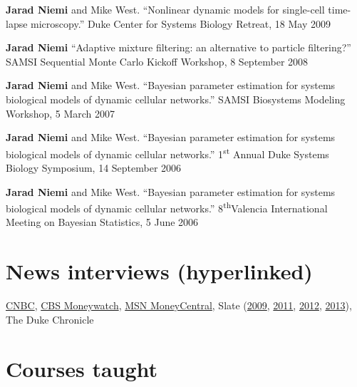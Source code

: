 \documentclass[overlapped,line]{res}
\begin{document}
\begin{resume}
{{\bf Jarad Niemi} and Mike West. ``Nonlinear dynamic models for single-cell time-lapse microscopy.'' Duke Center for Systems Biology Retreat, 18 May 2009

{\bf Jarad Niemi} ``Adaptive mixture filtering: an alternative to particle filtering?'' SAMSI Sequential Monte Carlo Kickoff Workshop, 8 September 2008

{\bf Jarad Niemi} and Mike West. ``Bayesian parameter estimation for systems biological models of dynamic cellular networks.'' SAMSI Biosystems Modeling Workshop, 5 March 2007

{\bf Jarad Niemi} and Mike West. ``Bayesian parameter estimation for systems biological models of dynamic cellular networks.'' 1\textsuperscript{st} Annual Duke Systems Biology Symposium, 14 September 2006

{\bf Jarad Niemi} and Mike West. ``Bayesian parameter estimation for systems biological models of dynamic cellular networks.'' 8\textsuperscript{th}Valencia International Meeting on Bayesian Statistics, 5 June 2006

}

\section{\bf News interviews (hyperlinked)}

\href{http://www.nbcnews.com/business/slam-dunk-your-rivals-office-march-madness-pool-1C8912546}{CNBC}, %
\href{http://moneywatch.bnet.com/economic-news/article/ncaa-brackets-how-to-win-your-march-madness-pool/403055/?tag=main;related-link-0}{CBS Moneywatch}, 
\href{http://articles.moneycentral.msn.com/SmartSpending/blog/page.aspx?post=1704157}{MSN MoneyCentral}, 
Slate (\href{http://www.slate.com/id/2213974/pagenum/all/}{2009}, \href{http://www.slate.com/id/2288234/pagenum/all/}{2011}, 
\href{http://www.slate.com/articles/sports/sports_nut/2012/03/ncaa_basketball_tournament_bracket_act_like_a_hedge_fund_manager_and_pick_ohio_state_to_win_it_all_.single.html}{2012}, 
\href{http://www.slate.com/articles/sports/sports_nut/2012/03/ncaa_basketball_tournament_bracket_act_like_a_hedge_fund_manager_and_pick_ohio_state_to_win_it_all_.single.html}{2013}),
The Duke Chronicle





\section{\bf Courses taught}
\vspace{0.1in}


\end{resume}
\end{document}
